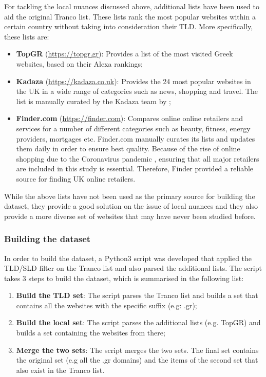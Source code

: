 \documentclass[../main.tex]{subfiles}
\begin{document}
For tackling the local nuances discussed above, additional lists have been used to aid the original Tranco list. These lists rank the most popular websites within a certain country without taking into consideration their TLD. More specifically, these lists are:

\begin{itemize}
    \item \textbf{TopGR} (\url{https://topgr.gr}): Provides a list of the most visited Greek websites, based on their Alexa rankings;

    \item \textbf{Kadaza} (\url{https://kadaza.co.uk}): Provides the 24 most popular websites in the UK in a wide range of categories such as news, shopping and travel. The list is manually curated by the Kadaza team by ;

    \item \textbf{Finder.com} (\url{https://finder.com}): Compares online online retailers and services for a number of different categories such as beauty, fitness, energy providers, mortgages etc. Finder.com manually curates its lists and updates them daily in order to ensure best quality. Because of the rise of online shopping due to the Coronavirus pandemic \cite{skeldon_2020, columbus_2020}, ensuring that all major retailers are included in this study is essential. Therefore, Finder provided a reliable source for finding UK online retailers. 
\end{itemize}

While the above lists have not been used as the primary source for building the dataset, they provide a good solution on the issue of local nuances and they also provide a more diverse set of websites that may have never been studied before.

\subsubsection{Building the dataset}
In order to build the dataset, a Python3 script was developed that applied the TLD/SLD filter on the Tranco list and also parsed the additional lists. The script takes 3 steps to build the dataset, which is summarised in the following list:

\begin{enumerate}
    \item \textbf{Build the TLD set}: The script parses the Tranco list and builds a set that contains all the websites with the specific suffix (e.g: .gr);

    \item \textbf{Build the local set}: The script parses the additional lists (e.g. TopGR) and builds a set containing the websites from there;

    \item \textbf{Merge the two sets}: The script merges the two sets. The final set contains the original set (e.g all the .gr domains) and the items of the second set that also exist in the Tranco list. 
\end{enumerate}
\end{document}
